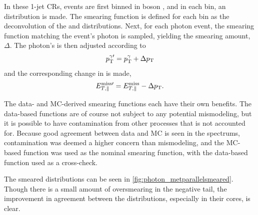 In these 1-jet \acp{CR}, events are first binned in boson \pt, and in each bin, an \metl distribution is made. The smearing function is defined for each bin as the deconvolution of the \dyjets and \gjets \metl distributions.
Next, for each photon event, the smearing function matching the event's photon \pt is sampled, yielding the smearing amount, $\Delta$\pt. The photon's \pt is then adjusted according to 
%
\begin{equation}
p_{\text{T}}^{\gamma\prime} = p_{\text{T}}^\gamma + \Delta p_{\text{T}} 
\end{equation} 
%
and the corresponding change in \met is made,
%
\begin{equation}
E_{T,\parallel}^{\text{miss}\prime} = E_{T,\parallel}^{\mathrm{miss}} - \Delta p_{\text{T}}.
\end{equation}

The data- and \ac{MC}-derived smearing functions each have their own benefits. The data-based functions are of course not subject to any potential mismodeling, but it is possible to have contamination from other processes that is not accounted for. Because good agreement between data and \ac{MC} is seen in the \metl spectrums, contamination was deemed a higher concern than mismodeling, and the \ac{MC}-based function was used as the nominal smearing function, with the data-based function used as a cross-check.

The smeared \metl distributions can be seen in \autoref{fig:photon_metparallelsmeared}. Though there is a small amount of oversmearing in the negative tail, the improvement in agreement between the distributions, especially in their cores, is clear.

